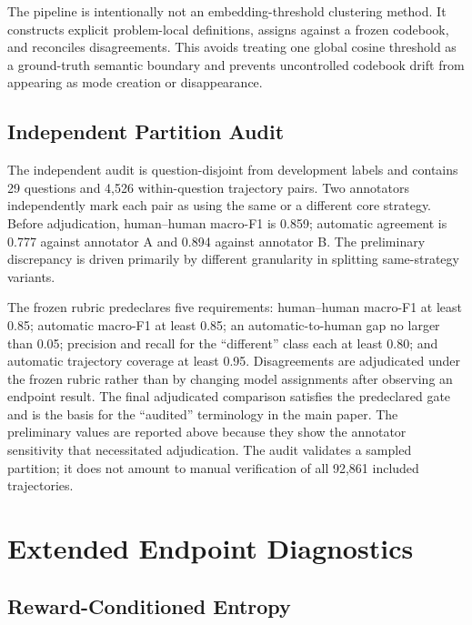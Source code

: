 \documentclass[letterpaper]{article}
\begin{document}
The pipeline is intentionally not an embedding-threshold clustering method.
It constructs explicit problem-local definitions, assigns against a frozen
codebook, and reconciles disagreements.  This avoids treating one global
cosine threshold as a ground-truth semantic boundary and prevents
uncontrolled codebook drift from appearing as mode creation or disappearance.

\subsection{Independent Partition Audit}

The independent audit is question-disjoint from development labels and
contains 29 questions and 4,526 within-question trajectory pairs.  Two
annotators independently mark each pair as using the same or a different core
strategy.  Before adjudication, human--human macro-F1 is 0.859; automatic
agreement is 0.777 against annotator A and 0.894 against annotator B.  The
preliminary discrepancy is driven primarily by different granularity in
splitting same-strategy variants.

The frozen rubric predeclares five requirements: human--human macro-F1 at
least 0.85; automatic macro-F1 at least 0.85; an automatic-to-human gap no
larger than 0.05; precision and recall for the ``different'' class each at
least 0.80; and automatic trajectory coverage at least 0.95.  Disagreements
are adjudicated under the frozen rubric rather than by changing model
assignments after observing an endpoint result.  The final adjudicated
comparison satisfies the predeclared gate and is the basis for the
``audited'' terminology in the main paper.  The preliminary values are
reported above because they show the annotator sensitivity that necessitated
adjudication.  The audit validates a sampled partition; it does not amount to
manual verification of all 92,861 included trajectories.

\section{Extended Endpoint Diagnostics}

\subsection{Reward-Conditioned Entropy}
\end{document}
